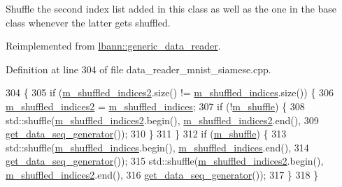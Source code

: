 Shuffle the second index list added in this class as well as the one in the base class whenever the latter gets shuffled. 

Reimplemented from \hyperlink{classlbann_1_1generic__data__reader_af1aaa4d1a693974c1b1f1318b6ed60b8}{lbann\+::generic\+\_\+data\+\_\+reader}.



Definition at line 304 of file data\+\_\+reader\+\_\+mnist\+\_\+siamese.\+cpp.


\begin{DoxyCode}
304                                                 \{
305   \textcolor{keywordflow}{if} (\hyperlink{classlbann_1_1data__reader__mnist__siamese_a42a4b1513a7305cc62d219ac0d9473c3}{m\_shuffled\_indices2}.size() != \hyperlink{classlbann_1_1generic__data__reader_aaab6aeff67ffff1c689336851fec2c57}{m\_shuffled\_indices}.size()) \{
306     \hyperlink{classlbann_1_1data__reader__mnist__siamese_a42a4b1513a7305cc62d219ac0d9473c3}{m\_shuffled\_indices2} = \hyperlink{classlbann_1_1generic__data__reader_aaab6aeff67ffff1c689336851fec2c57}{m\_shuffled\_indices};
307     \textcolor{keywordflow}{if} (!\hyperlink{classlbann_1_1generic__data__reader_a8039ed9c12a5847f0dcf7dd54b8d2f5b}{m\_shuffle}) \{
308       std::shuffle(\hyperlink{classlbann_1_1data__reader__mnist__siamese_a42a4b1513a7305cc62d219ac0d9473c3}{m\_shuffled\_indices2}.begin(), 
      \hyperlink{classlbann_1_1data__reader__mnist__siamese_a42a4b1513a7305cc62d219ac0d9473c3}{m\_shuffled\_indices2}.end(),
309                    \hyperlink{namespacelbann_aba9d11cb3a739cd84e7234ceeb32d098}{get\_data\_seq\_generator}());
310     \}
311   \}
312   \textcolor{keywordflow}{if} (\hyperlink{classlbann_1_1generic__data__reader_a8039ed9c12a5847f0dcf7dd54b8d2f5b}{m\_shuffle}) \{
313     std::shuffle(\hyperlink{classlbann_1_1generic__data__reader_aaab6aeff67ffff1c689336851fec2c57}{m\_shuffled\_indices}.begin(), 
      \hyperlink{classlbann_1_1generic__data__reader_aaab6aeff67ffff1c689336851fec2c57}{m\_shuffled\_indices}.end(),
314                  \hyperlink{namespacelbann_aba9d11cb3a739cd84e7234ceeb32d098}{get\_data\_seq\_generator}());
315     std::shuffle(\hyperlink{classlbann_1_1data__reader__mnist__siamese_a42a4b1513a7305cc62d219ac0d9473c3}{m\_shuffled\_indices2}.begin(), 
      \hyperlink{classlbann_1_1data__reader__mnist__siamese_a42a4b1513a7305cc62d219ac0d9473c3}{m\_shuffled\_indices2}.end(),
316                  \hyperlink{namespacelbann_aba9d11cb3a739cd84e7234ceeb32d098}{get\_data\_seq\_generator}());
317   \}
318 \}
\end{DoxyCode}
